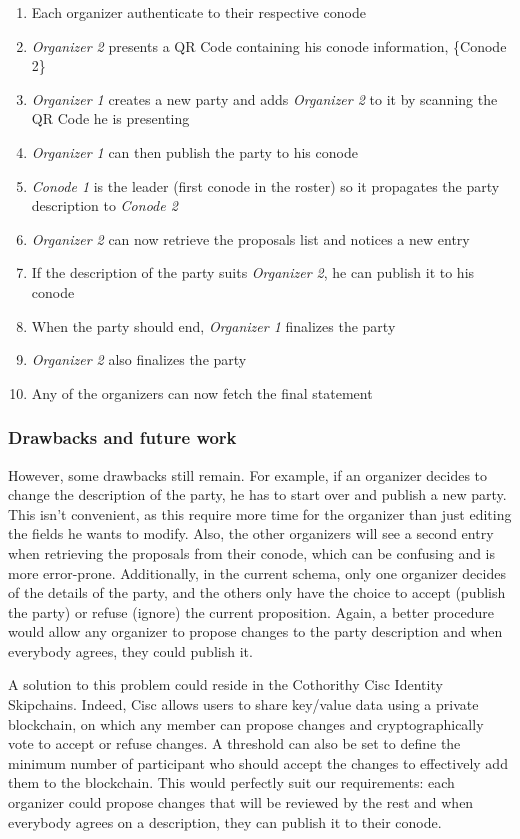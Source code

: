 \begin{enumerate}
	\item Each organizer authenticate to their respective conode
	\item \textit{Organizer 2} presents a QR Code containing his conode information, \{Conode 2\}
	\item \textit{Organizer 1} creates a new party and adds \textit{Organizer 2} to it by scanning the QR Code he is presenting
	\item \textit{Organizer 1} can then publish the party to his conode
	\item \textit{Conode 1} is the leader (first conode in the roster) so it propagates the party description to \textit{Conode 2}
	\item \textit{Organizer 2} can now retrieve the proposals list and notices a new entry
	\item  If the description of the party suits \textit{Organizer 2}, he can publish it to his conode
	\item When the party should end, \textit{Organizer 1} finalizes the party
	\item \textit{Organizer 2} also finalizes the party
	\item Any of the organizers can now fetch the final statement
\end{enumerate}
\subsubsection{Drawbacks and future work}
However, some drawbacks still remain. For example, if an organizer decides to change the description of the party, he has to start over and publish a new party.  This isn't convenient, as this require more time for the organizer than just editing the fields he wants to modify. Also, the other organizers will see a second entry when retrieving the proposals from their conode, which can be confusing and is more error-prone. Additionally, in the current schema, only one organizer decides of the details of the party, and the others only have the choice to accept (publish the party) or refuse (ignore) the current proposition. Again, a better procedure would allow any organizer to propose changes to the party description and when everybody agrees, they could publish it.

A solution to this problem could reside in the Cothorithy Cisc Identity Skipchains. Indeed, Cisc allows users to share key/value data using a private blockchain, on which any member can propose changes and cryptographically vote to accept or refuse changes. A threshold can also be set to define the minimum number of participant who should accept the changes to effectively add them to the blockchain. This would perfectly suit our requirements: each organizer could propose changes that will be reviewed by the rest and when everybody agrees on a description, they can publish it to their conode.
